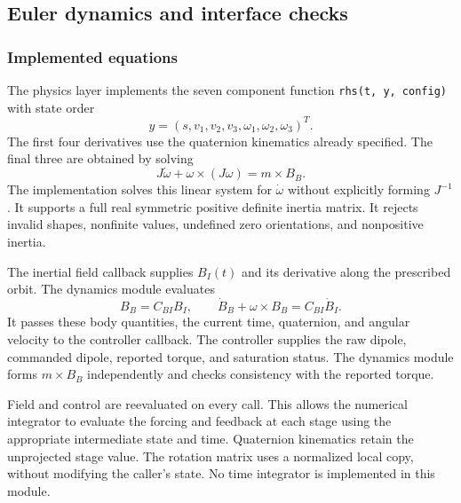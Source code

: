 \subsection{Euler dynamics and interface checks}

\subsubsection{Implemented equations}
The physics layer implements the seven component function \texttt{rhs(t, y, config)} with state order
\[
y=(s,v_1,v_2,v_3,\omega_1,\omega_2,\omega_3)^T.
\]
The first four derivatives use the quaternion kinematics already specified. The final three are obtained by solving
\[
J\dot\omega+\omega\times(J\omega)=m\times B_B.
\]
The implementation solves this linear system for \(\dot\omega\) without explicitly forming \(J^{-1}\). It supports a full real symmetric positive definite inertia matrix. It rejects invalid shapes, nonfinite values, undefined zero orientations, and nonpositive inertia.

The inertial field callback supplies \(B_I(t)\) and its derivative along the prescribed orbit. The dynamics module evaluates
\[
B_B=C_{BI}B_I,
\qquad
\dot B_B+\omega\times B_B=C_{BI}\dot B_I.
\]
It passes these body quantities, the current time, quaternion, and angular velocity to the controller callback. The controller supplies the raw dipole, commanded dipole, reported torque, and saturation status. The dynamics module forms \(m\times B_B\) independently and checks consistency with the reported torque.

Field and control are reevaluated on every call. This allows the numerical integrator to evaluate the forcing and feedback at each stage using the appropriate intermediate state and time. Quaternion kinematics retain the unprojected stage value. The rotation matrix uses a normalized local copy, without modifying the caller's state. No time integrator is implemented in this module.

